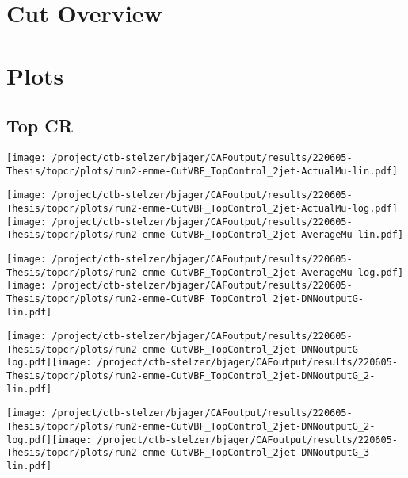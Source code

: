 \documentclass{article}
\begin{document}
\section[Cut Overview]{Cut Overview}

\centering


\section[Plots]{Plots}

\centering

\subsection[Top CR]{Top CR}

\centering

\texttt{[image: /project/ctb-stelzer/bjager/CAFoutput/results/220605-Thesis/topcr/plots/run2-emme-CutVBF\_TopControl\_2jet-ActualMu-lin.pdf]}

\texttt{[image: /project/ctb-stelzer/bjager/CAFoutput/results/220605-Thesis/topcr/plots/run2-emme-CutVBF\_TopControl\_2jet-ActualMu-log.pdf]}\texttt{[image: /project/ctb-stelzer/bjager/CAFoutput/results/220605-Thesis/topcr/plots/run2-emme-CutVBF\_TopControl\_2jet-AverageMu-lin.pdf]}

\texttt{[image: /project/ctb-stelzer/bjager/CAFoutput/results/220605-Thesis/topcr/plots/run2-emme-CutVBF\_TopControl\_2jet-AverageMu-log.pdf]}\texttt{[image: /project/ctb-stelzer/bjager/CAFoutput/results/220605-Thesis/topcr/plots/run2-emme-CutVBF\_TopControl\_2jet-DNNoutputG-lin.pdf]}

\texttt{[image: /project/ctb-stelzer/bjager/CAFoutput/results/220605-Thesis/topcr/plots/run2-emme-CutVBF\_TopControl\_2jet-DNNoutputG-log.pdf]}\texttt{[image: /project/ctb-stelzer/bjager/CAFoutput/results/220605-Thesis/topcr/plots/run2-emme-CutVBF\_TopControl\_2jet-DNNoutputG\_2-lin.pdf]}

\texttt{[image: /project/ctb-stelzer/bjager/CAFoutput/results/220605-Thesis/topcr/plots/run2-emme-CutVBF\_TopControl\_2jet-DNNoutputG\_2-log.pdf]}\texttt{[image: /project/ctb-stelzer/bjager/CAFoutput/results/220605-Thesis/topcr/plots/run2-emme-CutVBF\_TopControl\_2jet-DNNoutputG\_3-lin.pdf]}
\end{document}
